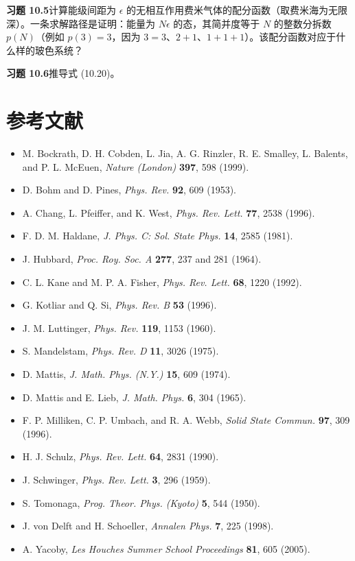 \textbf{习题 10.5}\quad 计算能级间距为 $\epsilon$ 的无相互作用费米气体的配分函数（取费米海为无限深）。一条求解路径是证明：能量为 $N\epsilon$ 的态，其简并度等于 $N$ 的整数分拆数 $p(N)$（例如 $p(3)=3$，因为 $3=3$、$2+1$、$1+1+1$）。该配分函数对应于什么样的玻色系统？

\textbf{习题 10.6}\quad 推导式 (10.20)。

\section*{参考文献}

\begin{itemize}[leftmargin=2em,itemsep=0pt,parsep=0pt,label={}]
\item [B1999] M. Bockrath, D. H. Cobden, L. Jia, A. G. Rinzler, R. E. Smalley, L. Balents, and P. L. McEuen, \emph{Nature (London)} \textbf{397}, 598 (1999).
\item [BP1953] D. Bohm and D. Pines, \emph{Phys. Rev.} \textbf{92}, 609 (1953).
\item [CPW1996] A. Chang, L. Pfeiffer, and K. West, \emph{Phys. Rev. Lett.} \textbf{77}, 2538 (1996).
\item [H1981] F. D. M. Haldane, \emph{J. Phys. C: Sol. State Phys.} \textbf{14}, 2585 (1981).
\item [H1964] J. Hubbard, \emph{Proc. Roy. Soc. A} \textbf{277}, 237 and 281 (1964).
\item [KF1992] C. L. Kane and M. P. A. Fisher, \emph{Phys. Rev. Lett.} \textbf{68}, 1220 (1992).
\item [KS1996] G. Kotliar and Q. Si, \emph{Phys. Rev. B} \textbf{53} (1996).
\item [L1960] J. M. Luttinger, \emph{Phys. Rev.} \textbf{119}, 1153 (1960).
\item [M1975] S. Mandelstam, \emph{Phys. Rev. D} \textbf{11}, 3026 (1975).
\item [M1974] D. Mattis, \emph{J. Math. Phys. (N.Y.)} \textbf{15}, 609 (1974).
\item [ML1965] D. Mattis and E. Lieb, \emph{J. Math. Phys.} \textbf{6}, 304 (1965).
\item [MUW1996] F. P. Milliken, C. P. Umbach, and R. A. Webb, \emph{Solid State Commun.} \textbf{97}, 309 (1996).
\item [S1990] H. J. Schulz, \emph{Phys. Rev. Lett.} \textbf{64}, 2831 (1990).
\item [S1959] J. Schwinger, \emph{Phys. Rev. Lett.} \textbf{3}, 296 (1959).
\item [T1950] S. Tomonaga, \emph{Prog. Theor. Phys. (Kyoto)} \textbf{5}, 544 (1950).
\item [VDS1998] J. von Delft and H. Schoeller, \emph{Annalen Phys.} \textbf{7}, 225 (1998).
\item [Y2005] A. Yacoby, \emph{Les Houches Summer School Proceedings} \textbf{81}, 605 (2005).
\end{itemize}
